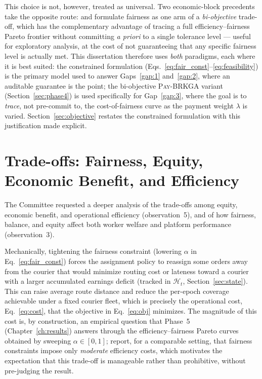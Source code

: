 \documentclass[12pt,a4paper]{report}
\begin{document}
This choice is not, however, treated as universal. Two economic-block precedents take the opposite route: \citet{wen2010dynamic} and \citet{sobhanan2024equity} formulate fairness as one arm of a \emph{bi-objective} trade-off, which has the complementary advantage of tracing a full efficiency--fairness Pareto frontier without committing \emph{a priori} to a single tolerance level --- useful for exploratory analysis, at the cost of not guaranteeing that any specific fairness level is actually met. This dissertation therefore uses \emph{both} paradigms, each where it is best suited: the constrained formulation (Eqs.~\ref{eq:fair_const}--\ref{eq:feasibility}) is the primary model used to answer Gaps~\ref{gap:1} and~\ref{gap:2}, where an auditable guarantee is the point; the bi-objective \textsc{Pay-BRKGA} variant (Section~\ref{sec:phase4}) is used specifically for Gap~\ref{gap:3}, where the goal is to \emph{trace}, not pre-commit to, the cost-of-fairness curve as the payment weight $\lambda$ is varied. Section~\ref{sec:objective} restates the constrained formulation with this justification made explicit.

\section{Trade-offs: Fairness, Equity, Economic Benefit, and Efficiency}
\label{sec:concept-tradeoffs}

The Committee requested a deeper analysis of the trade-offs among equity, economic benefit, and operational efficiency (observation~5), and of how fairness, balance, and equity affect both worker welfare and platform performance (observation~3).

Mechanically, tightening the fairness constraint (lowering $\alpha$ in Eq.~\ref{eq:fair_const}) forces the assignment policy to reassign some orders away from the courier that would minimize routing cost or lateness toward a courier with a larger accumulated earnings deficit (tracked in $\mathcal{H}_t$, Section~\ref{sec:state}). This can raise average route distance and reduce the per-epoch coverage achievable under a fixed courier fleet, which is precisely the operational cost, Eq.~\eqref{eq:cost}, that the objective in Eq.~\eqref{eq:obj} minimizes. The magnitude of this cost is, by construction, an empirical question that Phase~5 (Chapter~\ref{ch:results}) answers through the efficiency--fairness Pareto curves obtained by sweeping $\alpha \in [0,1]$; \citet{martinez2024exploring} report, for a comparable setting, that fairness constraints impose only \emph{moderate} efficiency costs, which motivates the expectation that this trade-off is manageable rather than prohibitive, without pre-judging the result.
\end{document}

